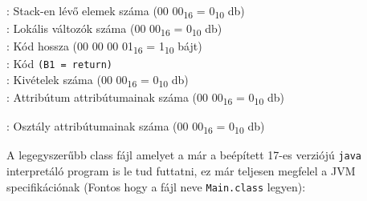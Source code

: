 \begin{compactitem}
\begin{compactitem}
\begin{compactitem}
\begin{compactitem}
                : Stack-en lévő elemek száma (00 00\textsubscript{16} = 0\textsubscript{10} db)  \\
                : Lokális változók száma (00 00\textsubscript{16} = 0\textsubscript{10} db) \\
                : Kód hossza (00 00 00 01\textsubscript{16} = 1\textsubscript{10} bájt) \\
                : Kód \lstinline{(B1 = return)}  \\
                : Kivételek száma (00 00\textsubscript{16} = 0\textsubscript{10} db) \\
                : Attribútum attribútumainak száma (00 00\textsubscript{16} = 0\textsubscript{10} db)
        \end{compactitem}
    \end{compactitem}
\end{compactitem}
\item {}: Osztály attribútumainak száma (00 00\textsubscript{16} = 0\textsubscript{10} db)
\end{compactitem}

A legegyszerűbb class fájl amelyet a már a beépített 17-es verziójú \lstinline{java} interpretáló program is le tud futtatni, ez már teljesen megfelel a JVM specifikációnak (Fontos hogy a fájl neve \lstinline{Main.class} legyen):

